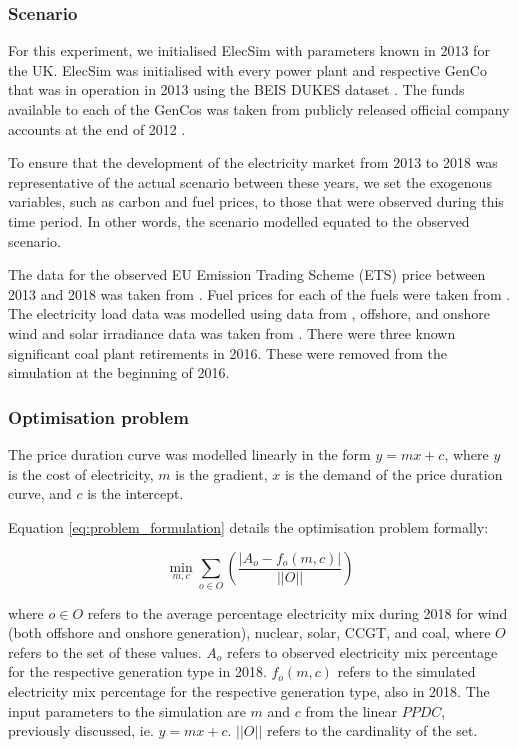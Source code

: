 \subsubsection{Scenario}

For this experiment, we initialised ElecSim with parameters known in 2013 for the UK. ElecSim was initialised with every power plant and respective GenCo that was in operation in 2013 using the BEIS DUKES dataset \cite{dukes_511}. The funds available to each of the GenCos was taken from publicly released official company accounts at the end of 2012 \cite{companies_house}.

To ensure that the development of the electricity market from 2013 to 2018 was representative of the actual scenario between these years, we set the exogenous variables, such as carbon and fuel prices, to those that were observed during this time period. In other words, the scenario modelled equated to the observed scenario. 

The data for the observed EU Emission Trading Scheme (ETS) price between 2013 and 2018 was taken from \cite{eu-ets}. Fuel prices for each of the fuels were taken from \cite{beis_fuel_price}. The electricity load data was modelled using data from \cite{gbnationalgridstatus_2019}, offshore, and onshore wind and solar irradiance data was taken from \cite{Pfenninger2016}. There were three known significant coal plant retirements in 2016. These were removed from the simulation at the beginning of 2016.



\subsubsection{Optimisation problem}
\label{ssec:optimisation-problem}

The price duration curve was modelled linearly in the form $y=mx+c$, where $y$ is the cost of electricity, $m$ is the gradient, $x$ is the demand of the price duration curve, and $c$ is the intercept.

Equation \ref{eq:problem_formulation} details the optimisation problem formally:

\begin{equation}
\label{eq:problem_formulation}
\min_{m,c} \sum\limits_{o\in O}\left(
\frac{\left|A_o-f_o(m,c)\right|}
{\left|\left|O\right|\right|}
\right)
\end{equation}

\noindent where $o\in O$ refers to the average percentage electricity mix during 2018 for wind (both offshore and onshore generation), nuclear, solar, CCGT, and coal, where $O$ refers to the set of these values. $A_o$ refers to observed electricity mix percentage for the respective generation type in 2018. $f_o(m,c)$ refers to the simulated electricity mix percentage for the respective generation type, also in 2018. The input parameters to the simulation are $m$ and $c$ from the linear $PPDC$, previously discussed, ie. $y=mx+c$. $\left|\left|O\right|\right|$ refers to the cardinality of the set.



